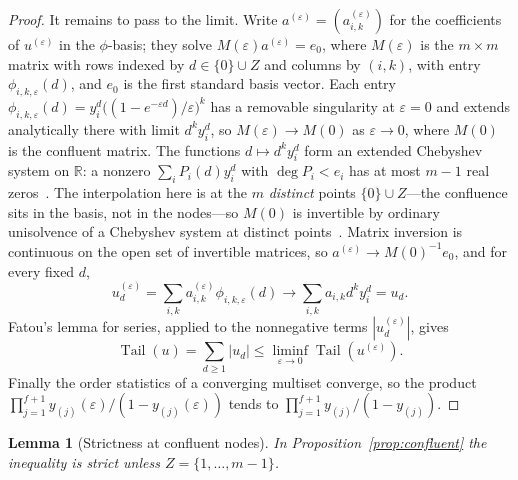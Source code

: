 \documentclass[11pt]{article}
\newtheorem{lemma}[theorem]{Lemma}
\theoremstyle{definition}
\theoremstyle{plain}
\newcommand{\R}{\mathbb R}
\DeclareMathOperator{\Tail}{Tail}
\begin{document}
\begin{proof}
It remains to pass to the limit.  Write
$a^{(\varepsilon)}=(a^{(\varepsilon)}_{i,k})$ for the coefficients of
$u^{(\varepsilon)}$ in the $\phi$-basis; they solve
$M(\varepsilon)a^{(\varepsilon)}=e_0$, where $M(\varepsilon)$ is the
$m\times m$ matrix with rows indexed by $d\in\{0\}\cup Z$ and columns by
$(i,k)$, with entry $\phi_{i,k,\varepsilon}(d)$, and $e_0$ is the first
standard basis vector.  Each entry
$\phi_{i,k,\varepsilon}(d)=y_i^d\bigl((1-e^{-\varepsilon d})/\varepsilon\bigr)^k$
has a removable singularity at $\varepsilon=0$ and extends analytically there
with limit $d^ky_i^d$, so $M(\varepsilon)\to M(0)$ as $\varepsilon\to0$, where
$M(0)$ is the confluent matrix.  The functions
$d\mapsto d^ky_i^d$ form an extended Chebyshev system on $\R$: a nonzero
$\sum_iP_i(d)y_i^d$ with $\deg P_i<e_i$ has at most $m-1$ real
zeros~\cite[Part~Five, Ch.~1]{polya-szego}.  The
interpolation here is at the $m$ \emph{distinct} points $\{0\}\cup Z$---the
confluence sits in the basis, not in the nodes---so $M(0)$ is invertible by
ordinary unisolvence of a Chebyshev system at distinct
points~\cite[Chapter~I, Theorem~4.1]{karlin-studden}.  Matrix inversion is
continuous on the open set of invertible matrices, so
$a^{(\varepsilon)}\to M(0)^{-1}e_0$, and for every fixed $d$,
\[
  u^{(\varepsilon)}_d
  =\sum_{i,k}a^{(\varepsilon)}_{i,k}\phi_{i,k,\varepsilon}(d)
  \longrightarrow\sum_{i,k}a_{i,k}d^ky_i^d=u_d .
\]
Fatou's lemma for series, applied to the nonnegative terms
$|u^{(\varepsilon)}_d|$, gives
\[
  \Tail(u)=\sum_{d\ge1}|u_d|
  \le\liminf_{\varepsilon\to0}\Tail(u^{(\varepsilon)}).
\]
Finally the order statistics of a converging multiset converge, so the
product $\prod_{j=1}^{f+1}y_{(j)}(\varepsilon)/(1-y_{(j)}(\varepsilon))$
tends to $\prod_{j=1}^{f+1}y_{(j)}/(1-y_{(j)})$.
\end{proof}

\begin{lemma}[Strictness at confluent nodes]\label{lem:confstrict}
In Proposition~\ref{prop:confluent} the inequality is strict unless
$Z=\{1,\ldots,m-1\}$.
\end{lemma}
\end{document}
